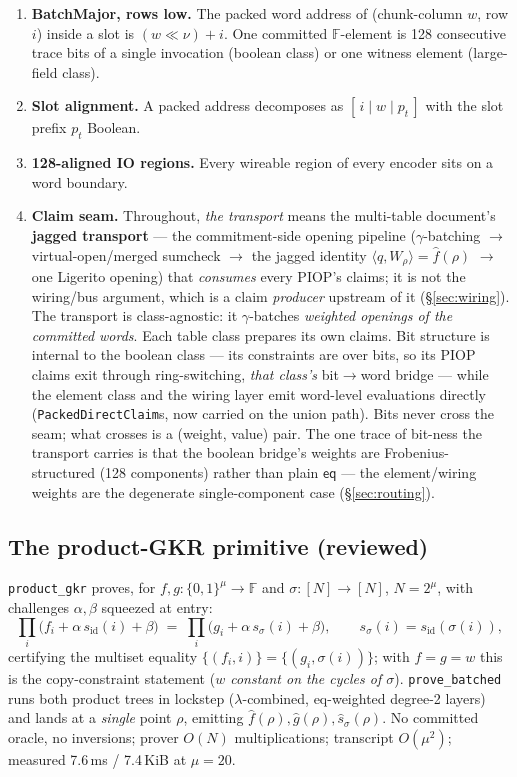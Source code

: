 \documentclass[11pt]{article}
\newcommand{\F}{\mathbb{F}}
\newcommand{\eq}{\mathsf{eq}}
\newcommand{\ip}[2]{\langle #1, #2 \rangle}
\newcommand{\code}[1]{\texttt{#1}}
\newcommand{\sid}{s_{\mathrm{id}}}
\newcommand{\ssig}{s_{\sigma}}
\theoremstyle{definition}
\begin{document}
\begin{enumerate}[nosep]
  \item \textbf{BatchMajor, rows low.} The packed word address of
        (chunk-column $w$, row $i$) inside a slot is $(w \ll \nu) + i$.
        One committed $\F$-element is 128 consecutive trace bits of a
        single invocation (boolean class) or one witness element
        (large-field class).
  \item \textbf{Slot alignment.} A packed address decomposes as
        $[\, i \mid w \mid p_t \,]$ with the slot prefix $p_t$ Boolean.
  \item \textbf{128-aligned IO regions.} Every wireable region of every
        encoder sits on a word boundary.
  \item \textbf{Claim seam.} Throughout, \emph{the transport} means the
        multi-table document's \textbf{jagged transport} --- the
        commitment-side opening pipeline ($\gamma$-batching $\to$
        virtual-open/merged sumcheck $\to$ the jagged identity
        $\ip{q}{W_\rho} = \hat f(\rho)$ $\to$ one Ligerito opening) that
        \emph{consumes} every PIOP's claims; it is not the wiring/bus
        argument, which is a claim \emph{producer} upstream of it
        (\S\ref{sec:wiring}). The transport is class-agnostic: it
        $\gamma$-batches \emph{weighted openings of the committed words}.
        Each table class prepares its own claims. Bit structure is
        internal to the boolean class --- its constraints are over bits,
        so its PIOP claims exit through ring-switching, \emph{that
        class's} bit$\to$word bridge --- while the element class and the
        wiring layer emit word-level evaluations directly
        (\code{PackedDirectClaim}s, now carried on the union path). Bits
        never cross the seam; what crosses is a (weight, value) pair. The
        one trace of bit-ness the transport carries is that the boolean
        bridge's weights are Frobenius-structured (128 components) rather
        than plain $\eq$ --- the element/wiring weights are the
        degenerate single-component case (\S\ref{sec:routing}).
\end{enumerate}

\subsection{The product-GKR primitive (reviewed)}\label{sec:gkr}

\code{product\_gkr} proves, for $f, g : \{0,1\}^\mu \to \F$ and
$\sigma : [N] \to [N]$, $N = 2^\mu$, with challenges $\alpha, \beta$
squeezed at entry:
\[
  \prod_i \bigl(f_i + \alpha\,\sid(i) + \beta\bigr) \;=\;
  \prod_i \bigl(g_i + \alpha\,\ssig(i) + \beta\bigr),
  \qquad \ssig(i) = \sid(\sigma(i)),
\]
certifying the multiset equality $\{(f_i, i)\} = \{(g_i, \sigma(i))\}$;
with $f = g = w$ this is the copy-constraint statement (\emph{$w$ constant
on the cycles of $\sigma$}). \code{prove\_batched} runs both product trees
in lockstep ($\lambda$-combined, eq-weighted degree-2 layers) and lands at
a \emph{single} point $\rho$, emitting $\hat f(\rho), \hat g(\rho),
\hat s_\sigma(\rho)$. No committed oracle, no inversions; prover $O(N)$
multiplications; transcript $O(\mu^2)$; measured 7.6\,ms / 7.4\,KiB at
$\mu = 20$.
\end{document}
